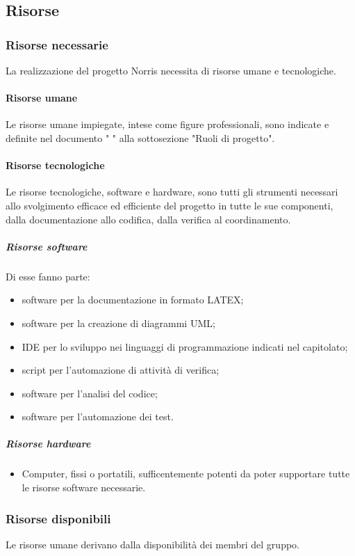 	\subsection{Risorse}
	\subsubsection{Risorse necessarie}
	La realizzazione del progetto Norris necessita di risorse umane e tecnologiche.
	\paragraph{Risorse umane}
		Le risorse umane impiegate, intese come figure professionali, sono indicate e definite nel documento " \lastversion" alla sottosezione "Ruoli di progetto".
	\paragraph{Risorse tecnologiche}
		Le risorse tecnologiche, software e hardware, sono tutti gli strumenti necessari allo svolgimento efficace ed efficiente del progetto in tutte le sue componenti, dalla documentazione allo codifica, dalla verifica al coordinamento.
		\subparagraph{Risorse software}
		Di esse fanno parte:
			\begin{itemize}
				\item software per la documentazione in formato LATEX;
				\item software per la creazione di diagrammi UML;
				\item IDE per lo sviluppo nei linguaggi di programmazione indicati nel capitolato;
				\item script per l'automazione di attività di verifica;
				\item software per l'analisi del codice;
				\item software per l'automazione dei test.
			\end{itemize}
		\subparagraph{Risorse hardware}
			\begin{itemize}
				\item Computer, fissi o portatili, sufficentemente potenti da poter supportare tutte le risorse software necessarie.
			\end{itemize}
	\subsubsection{Risorse disponibili}
	Le risorse umane derivano dalla disponibilità dei membri del gruppo.
